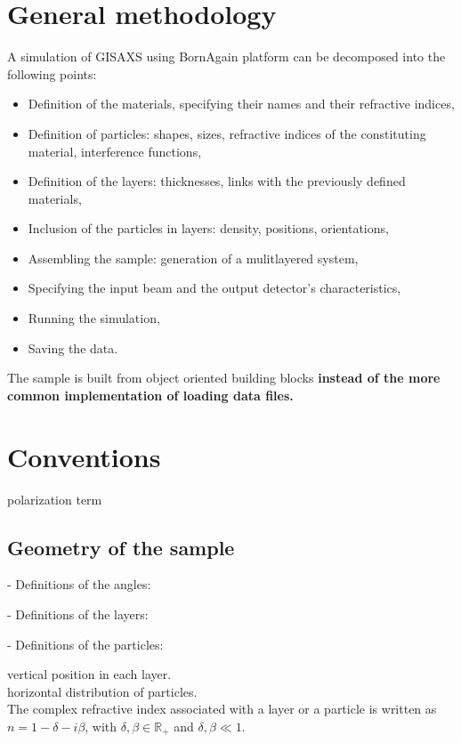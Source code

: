 \section{General methodology}
A simulation of GISAXS using BornAgain platform can be decomposed into the following points:
\begin{itemize}
\item Definition of the materials, specifying their names and their
  refractive indices,
\item Definition of particles: shapes, sizes, refractive indices of
  the constituting material, interference functions,
\item Definition of the layers: thicknesses, links with the previously defined
materials,
\item Inclusion of the particles in layers: density, positions, orientations, 
\item Assembling the sample: generation of a mulitlayered system,
\item Specifying the input beam and the output detector's
  characteristics,
\item Running the simulation,
\item Saving the data.
\end{itemize}

The sample is built from object oriented building blocks \textbf{instead of
the more common implementation of loading data files.}

\section{Conventions}
polarization term

\subsection{Geometry of the sample}
- Definitions of the angles:

- Definitions of the layers:

- Definitions of the particles:

\noindent vertical position in each layer.\\

\noindent horizontal distribution of particles.\\

\noindent The complex refractive index associated with a layer or a particle is written as $n=1-\delta -i\beta$, with
$\delta, \beta \in \mathbb{R}_+$ and $\delta, \beta \ll 1$. \\

